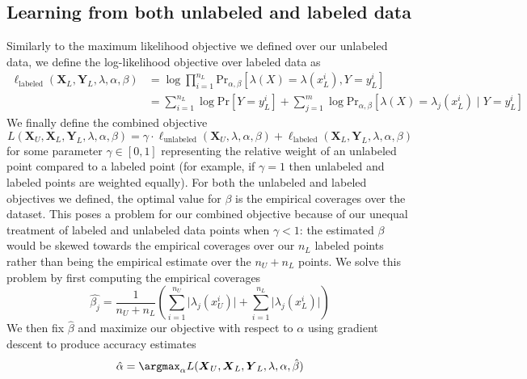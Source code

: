 
\subsection{Learning from both unlabeled and labeled data}
\label{sec:joint_objective}

Similarly to the maximum likelihood objective we defined over our unlabeled data, we define the log-likelihood objective over labeled data as
\begin{align}
    \ell_\text{labeled}(\boldsymbol{X}_L,\boldsymbol{Y}_L,\lambda,\alpha,\beta)&=\log\prod_{i=1}^{n_L}\text{Pr}_{\alpha,\beta}[\lambda(X)=\lambda(x^i_L),Y=y^i_L]\\
    &=\sum_{i=1}^{n_L}\log\text{Pr}[Y=y^i_L]+\sum_{j=1}^m\log\text{Pr}_{\alpha,\beta}[\lambda(X)=\lambda_j(x^i_L)\mid Y=y^i_L]
\end{align}
We finally define the combined objective
\begin{equation}
    L(\boldsymbol{X}_U,\boldsymbol{X}_L,\boldsymbol{Y}_L,\lambda,\alpha,\beta)=\gamma\cdot\ell_\text{unlabeled}(\boldsymbol{X}_U,\lambda,\alpha,\beta)+\ell_\text{labeled}(\boldsymbol{X}_L,\boldsymbol{Y}_L,\lambda,\alpha,\beta)
\end{equation}
for some parameter $\gamma\in[0,1]$ representing the relative weight of an unlabeled point compared to a labeled point (for example, if $\gamma=1$ then unlabeled and labeled points are weighted equally). For both the unlabeled and labeled objectives we defined, the optimal value for $\beta$ is the empirical coverages over the dataset. This poses a problem for our combined objective because of our unequal treatment of labeled and unlabeled data points when $\gamma<1$: the estimated $\beta$ would be skewed towards the empirical coverages over our $n_L$ labeled points rather than being the empirical estimate over the $n_U+n_L$ points. We solve this problem by first computing the empirical coverages
\begin{equation}
    \hat{\beta_j}=\frac{1}{n_U+n_L}(\sum_{i=1}^{n_U}\lvert\lambda_j(x^i_U)\rvert+\sum_{i=1}^{n_L}\lvert\lambda_j(x^i_L)\rvert)
\end{equation}
We then fix $\hat{\beta}$ and maximize our objective with respect to $\alpha$ using gradient descent to produce accuracy estimates
\begin{equation}
    \hat{\alpha}=\argmax_\alpha L(\boldsymbol{X}_U,\boldsymbol{X}_L,\boldsymbol{Y}_L,\lambda,\alpha,\hat{\beta})
\end{equation}

